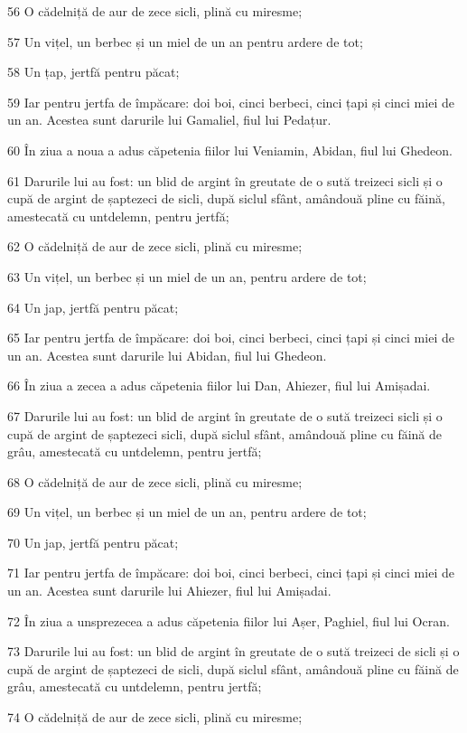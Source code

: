 \par 56 O cădelniță de aur de zece sicli, plină cu miresme;
\par 57 Un vițel, un berbec și un miel de un an pentru ardere de tot;
\par 58 Un țap, jertfă pentru păcat;
\par 59 Iar pentru jertfa de împăcare: doi boi, cinci berbeci, cinci țapi și cinci miei de un an. Acestea sunt darurile lui Gamaliel, fiul lui Pedațur.
\par 60 În ziua a noua a adus căpetenia fiilor lui Veniamin, Abidan, fiul lui Ghedeon.
\par 61 Darurile lui au fost: un blid de argint în greutate de o sută treizeci sicli și o cupă de argint de șaptezeci de sicli, după siclul sfânt, amândouă pline cu făină, amestecată cu untdelemn, pentru jertfă;
\par 62 O cădelniță de aur de zece sicli, plină cu miresme;
\par 63 Un vițel, un berbec și un miel de un an, pentru ardere de tot;
\par 64 Un jap, jertfă pentru păcat;
\par 65 Iar pentru jertfa de împăcare: doi boi, cinci berbeci, cinci țapi și cinci miei de un an. Acestea sunt darurile lui Abidan, fiul lui Ghedeon.
\par 66 În ziua a zecea a adus căpetenia fiilor lui Dan, Ahiezer, fiul lui Amișadai.
\par 67 Darurile lui au fost: un blid de argint în greutate de o sută treizeci sicli și o cupă de argint de șaptezeci sicli, după siclul sfânt, amândouă pline cu făină de grâu, amestecată cu untdelemn, pentru jertfă;
\par 68 O cădelniță de aur de zece sicli, plină cu miresme;
\par 69 Un vițel, un berbec și un miel de un an, pentru ardere de tot;
\par 70 Un jap, jertfă pentru păcat;
\par 71 Iar pentru jertfa de împăcare: doi boi, cinci berbeci, cinci țapi și cinci miei de un an. Acestea sunt darurile lui Ahiezer, fiul lui Amișadai.
\par 72 În ziua a unsprezecea a adus căpetenia fiilor lui Așer, Paghiel, fiul lui Ocran.
\par 73 Darurile lui au fost: un blid de argint în greutate de o sută treizeci de sicli și o cupă de argint de șaptezeci de sicli, după siclul sfânt, amândouă pline cu făină de grâu, amestecată cu untdelemn, pentru jertfă;
\par 74 O cădelniță de aur de zece sicli, plină cu miresme;
